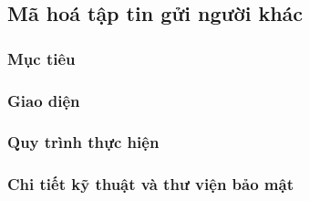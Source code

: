 \newpage
\subsection{Mã hoá tập tin gửi người khác}
\subsubsection*{Mục tiêu}

\subsubsection*{Giao diện}

\subsubsection*{Quy trình thực hiện}

\subsubsection*{Chi tiết kỹ thuật và thư viện bảo mật}